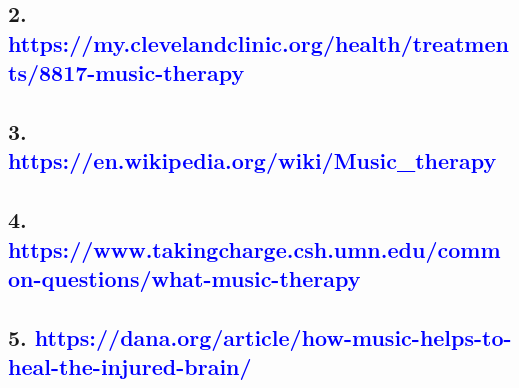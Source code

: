 \documentclass[12pt]{article}
\begin{document}
\subsection*{\textbf{2.\hspace{1cm}\large{\textcolor{blue}{	https://my.clevelandclinic.org/health/treatments/8817-music-therapy}}}}
\subsection*{\textbf{3.\hspace{1cm}\large{\textcolor{blue}{	https://en.wikipedia.org/wiki/Music_therapy}}}}
\subsection*{\textbf{4.\hspace{1cm}\large{\textcolor{blue}{	https://www.takingcharge.csh.umn.edu/common-questions/what-music-therapy}}}}
\subsection*{\textbf{5.\hspace{1cm}\large{\textcolor{blue}{	https://dana.org/article/how-music-helps-to-heal-the-injured-brain/}}}}
\end{document}
